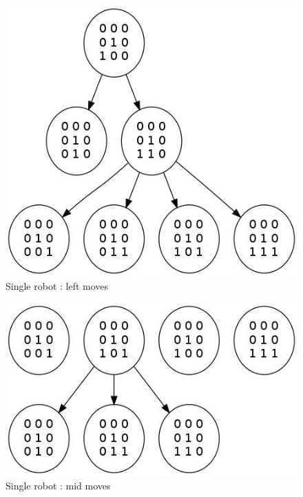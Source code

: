 \documentclass[11pt, a4paper]{article}
\theoremstyle{plain}
\theoremstyle{definition}
\theoremstyle{remark}
\begin{document}
\begin{figure}
\includegraphics[scale=0.50]{graph_images/graph_single_left.jpg}
\caption{Single robot : left moves}
\label{graph:single_left}
\end{figure}

\begin{figure}
\includegraphics[scale=0.50]{graph_images/graph_single_mid.jpg}
\caption{Single robot : mid moves}
\label{graph:mid}
\end{figure}
\end{document}
